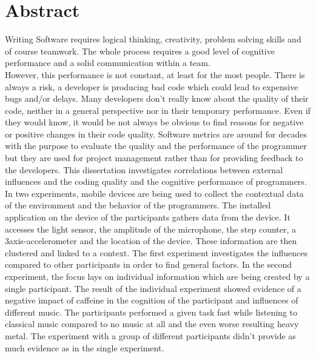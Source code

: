 \section*{Abstract}


Writing Software requires logical thinking, creativity, problem solving skills and of course teamwork. The whole process requires a good level of cognitive performance and a solid communication within a team.\\
However, this performance is not constant, at least for the most people. There is always a risk, a developer is producing bad code which could lead to expensive bugs and/or delays. 
Many developers don't really know about the quality of their code, neither in a general perspective nor in their temporary performance. Even if they would know, it would be not always be obvious to find reasons for negative or positive changes in their code quality.
Software metrics are around for decades with the purpose to evaluate the quality and the performance of the programmer but they are used for project management rather than for providing feedback to the developers. 
\bigbreak
This dissertation investigates correlations between external influences and the coding quality and the cognitive performance of programmers. 
In two experiments, mobile devices are being used to collect the contextual data of the environment and the behavior of the programmers. 
The installed application on the device of the participants gathers data from the device. It accesses the light sensor, the amplitude of the microphone, the step counter, a 3axis-accelerometer and the location of the device. These information are then clustered and linked to a context. 
The first experiment investigates the influences compared to other participants in order to find general factors. In the second experiment, the focus lays on individual information which are being created by a single participant. 
\bigbreak
The result of the individual experiment showed evidence of a negative impact of caffeine in the cognition of the participant and influences of different music. The participants performed a given task fast while listening to classical music compared to no music at all and the even worse resulting heavy metal. 
The experiment with a group of different participants didn't provide as much evidence as in the single experiment. 


